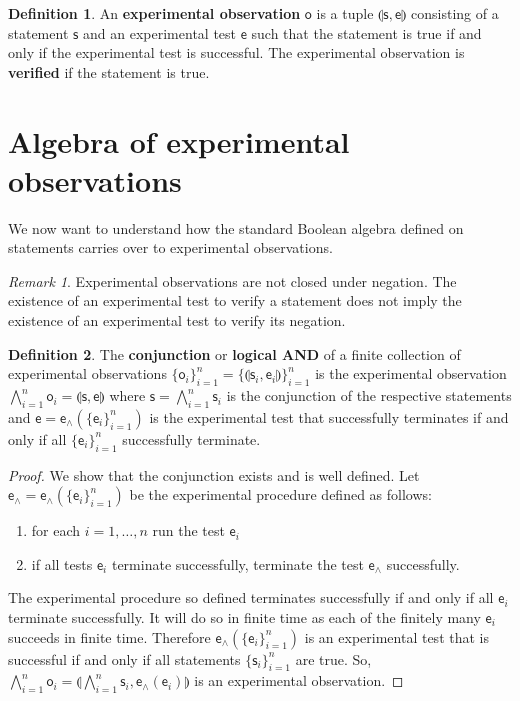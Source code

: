 \documentclass[review]{elsarticle}
\theoremstyle{plain}%
\theoremstyle{definition}
\newtheorem{defn}{Definition}[section]
\theoremstyle{remark}
\newtheorem*{rem}{Remark}
\begin{document}
\begin{defn}
	An \textbf{experimental observation} $\mathsf{o}$ is a tuple $\llparenthesis \mathsf{s}, \mathsf{e} \rrparenthesis$ consisting of a statement $\mathsf{s}$ and an experimental test $\mathsf{e}$ such that the statement is true if and only if the  experimental test is successful. The experimental observation is \textbf{verified} if the statement is true.
\end{defn}

\section{Algebra of experimental observations}

We now want to understand how the standard Boolean algebra defined on statements carries over to experimental observations.

\begin{rem}
	Experimental observations are not closed under negation. The existence of an experimental test to verify a statement does not imply the existence of an experimental test to verify its negation.
\end{rem}

\begin{defn}
	The \textbf{conjunction} or \textbf{logical AND} of a finite collection  of experimental observations $\{\mathsf{o}_i\}_{i=1}^{n}=\{\llparenthesis \mathsf{s}_i, \mathsf{e}_i\rrparenthesis\}_{i=1}^{n}$ is the experimental observation $\bigwedge\limits_{i=1}^{n} \mathsf{o}_i = \llparenthesis \mathsf{s}, \mathsf{e}\rrparenthesis$ where $\mathsf{s} = \bigwedge\limits_{i=1}^{n} \mathsf{s}_i$ is the conjunction of the respective statements and $\mathsf{e} = \mathsf{e}_\wedge(\{\mathsf{e}_i\}_{i=1}^{n})$ is the experimental test that successfully terminates if and only if all $\{\mathsf{e}_i\}_{i=1}^{n}$ successfully terminate.
\end{defn}

\begin{proof}
	We show that the conjunction exists and is well defined. Let $\mathsf{e}_\wedge=\mathsf{e}_\wedge(\{\mathsf{e}_i\}_{i=1}^{n})$ be the experimental procedure defined as follows:
	\begin{enumerate}
	\item for each $i=1,\ldots,n$ run the test $\mathsf{e}_i$
	\item if all tests $\mathsf{e}_i$ terminate successfully, terminate the test $\mathsf{e}_\wedge$ successfully.
	\end{enumerate}
	The experimental procedure so defined terminates successfully if and only if all $\mathsf{e}_i$ terminate successfully. It will do so in finite time as each of the finitely many $\mathsf{e}_i$ succeeds in finite time. Therefore $\mathsf{e}_\wedge(\{\mathsf{e}_i\}_{i=1}^{n})$ is an experimental test that is successful if and only if all statements $\{\mathsf{s}_i\}_{i=1}^{n}$ are true. So, $\bigwedge\limits_{i=1}^{n} \mathsf{o}_i = \llparenthesis\bigwedge\limits_{i=1}^{n} \mathsf{s}_i, \mathsf{e}_{\wedge}(\mathsf{e}_i)\rrparenthesis$ is an experimental observation.
\end{proof}
\end{document}

